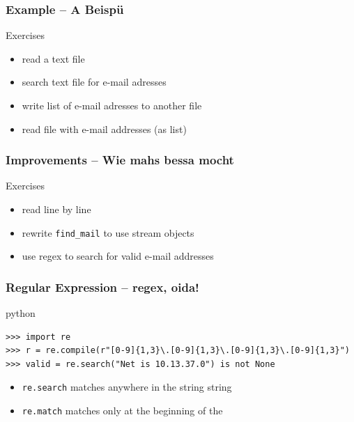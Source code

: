 \documentclass{beamer}
\begin{document}
\begin{frame}[fragile]
	\frametitle{Example -- A Beispü}
	
	\begin{block}{Exercises}
	\begin{itemize}
	\item[\checkmark] read a text file
	\item[\checkmark] search text file for e-mail adresses
	\item[\checkmark] write list of e-mail adresses to another file
	\item[\checkmark] read file with e-mail addresses (as list)
	\end{itemize}
	\end{block}

\end{frame}

\begin{frame}[fragile]
	\frametitle{Improvements -- Wie mahs bessa mocht}
	
	\begin{block}{Exercises}
	\begin{itemize}
	\item[\checkmark] read line by line
	\item[\checkmark] rewrite \texttt{find\_mail} to use stream objects
	\item[\checkmark] use regex to search for valid e-mail addresses
	\end{itemize}
	\end{block}

\end{frame}


\begin{frame}[fragile]
	\frametitle{Regular Expression -- regex, oida!}
	
	\begin{exampleblock}{python}
	\begin{lstlisting}
>>> import re
>>> r = re.compile(r"[0-9]{1,3}\.[0-9]{1,3}\.[0-9]{1,3}\.[0-9]{1,3}")
>>> valid = re.search("Net is 10.13.37.0") is not None
	\end{lstlisting}
	\end{exampleblock}
	
	\begin{itemize}
	\item \texttt{re.search} matches anywhere in the string string
	\item \texttt{re.match} matches only at the beginning of the
	\end{itemize}
\end{frame}
\end{document}
